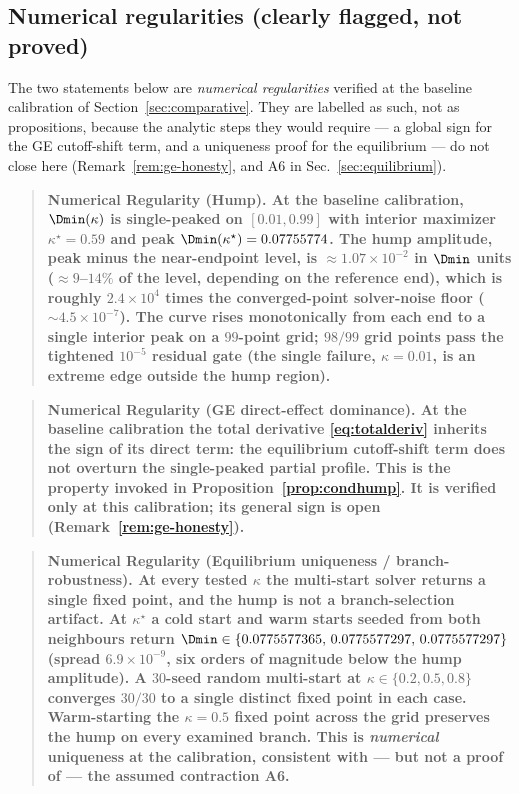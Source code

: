 \subsection{Numerical regularities (clearly flagged, not proved)}
\label{app:numreg}

The two statements below are \emph{numerical regularities} verified at the
baseline calibration of Section~\ref{sec:comparative}. They are labelled as
such, not as propositions, because the analytic steps they would require ---
a global sign for the GE cutoff-shift term, and a uniqueness proof for the
equilibrium --- do not close here (Remark~\ref{rem:ge-honesty}, and A6 in
Sec.~\ref{sec:equilibrium}).

\begin{quote}\bfseries
Numerical Regularity (Hump).\label{nr:hump}\normalfont\quad
At the baseline calibration, $\Dmin(\kappa)$ is single-peaked on $[0.01,0.99]$
with interior maximizer $\kappa^{\star}=0.59$ and peak
$\Dmin(\kappa^{\star})=0.07755774$. The hump amplitude, peak minus the
near-endpoint level, is $\approx 1.07\times10^{-2}$ in $\Dmin$ units
($\approx 9$--$14\%$ of the level, depending on the reference end), which is
roughly $2.4\times10^{4}$ times the converged-point solver-noise floor
($\sim 4.5\times10^{-7}$). The curve rises monotonically from each end to a
single interior peak on a $99$-point grid; $98/99$ grid points pass the
tightened $10^{-5}$ residual gate (the single failure, $\kappa=0.01$, is an
extreme edge outside the hump region).
\end{quote}

\begin{quote}\bfseries
Numerical Regularity (GE direct-effect dominance).\label{nr:ge}\normalfont\quad
At the baseline calibration the total derivative \eqref{eq:totalderiv}
inherits the sign of its direct term: the equilibrium cutoff-shift term does
not overturn the single-peaked partial profile. This is the property invoked
in Proposition~\ref{prop:condhump}. It is verified only at this calibration;
its general sign is open (Remark~\ref{rem:ge-honesty}).
\end{quote}

\begin{quote}\bfseries
Numerical Regularity (Equilibrium uniqueness / branch-robustness).%
\label{nr:unique}\normalfont\quad
At every tested $\kappa$ the multi-start solver returns a single fixed point,
and the hump is not a branch-selection artifact. At $\kappa^{\star}$ a cold
start and warm starts seeded from both neighbours return $\Dmin\in
\{0.0775577365,\,0.0775577297,\,0.0775577297\}$ (spread $6.9\times10^{-9}$,
six orders of magnitude below the hump amplitude). A $30$-seed random
multi-start at $\kappa\in\{0.2,0.5,0.8\}$ converges $30/30$ to a single
distinct fixed point in each case. Warm-starting the $\kappa=0.5$ fixed
point across the grid preserves the hump on every examined branch. This is
\emph{numerical} uniqueness at the calibration, consistent with --- but not a
proof of --- the assumed contraction A6.
\end{quote}

